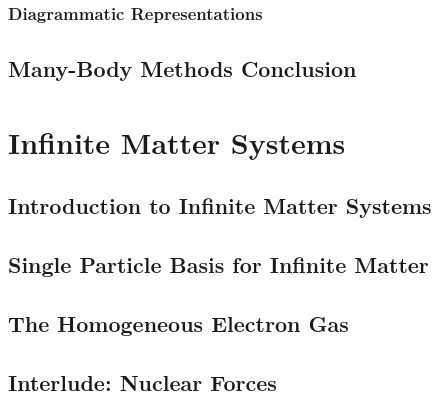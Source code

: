 \documentclass[12pt]{book}
\begin{document}
        \subsection{Diagrammatic Representations}
                

    \section{Many-Body Methods Conclusion}
        


\chapter{Infinite Matter Systems}
    \section{Introduction to Infinite Matter Systems}
        

    \section{Single Particle Basis for Infinite Matter}
        

    \section{The Homogeneous Electron Gas}
        

    \section{Interlude: Nuclear Forces}
        

\end{document}
